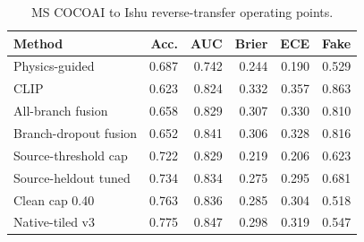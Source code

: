 \begin{table}[t]
\centering
\small
\caption{MS COCOAI to Ishu reverse-transfer operating points.}
\label{tab:reverse-operating-points}
\begin{tabular}{l r r r r r}
\toprule
Method & Acc. & AUC & Brier & ECE & Fake \\
\midrule
Physics-guided & 0.687 & 0.742 & 0.244 & 0.190 & 0.529 \\
CLIP & 0.623 & 0.824 & 0.332 & 0.357 & 0.863 \\
All-branch fusion & 0.658 & 0.829 & 0.307 & 0.330 & 0.810 \\
Branch-dropout fusion & 0.652 & 0.841 & 0.306 & 0.328 & 0.816 \\
Source-threshold cap & 0.722 & 0.829 & 0.219 & 0.206 & 0.623 \\
Source-heldout tuned & 0.734 & 0.834 & 0.275 & 0.295 & 0.681 \\
Clean cap 0.40 & 0.763 & 0.836 & 0.285 & 0.304 & 0.518 \\
Native-tiled v3 & 0.775 & 0.847 & 0.298 & 0.319 & 0.547 \\
\bottomrule
\end{tabular}
\end{table}
